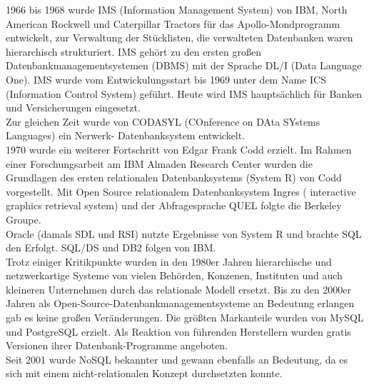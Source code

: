 \documentclass[12pt,a4paper]{report}
\begin{document}
\begin{onehalfspace}
1966 bis 1968 wurde IMS (Information Management System) von IBM, North American Rockwell und Caterpillar Tractors für das Apollo-Mondprogramm entwickelt, zur Verwaltung der Stücklisten, die verwalteten Datenbanken waren hierarchisch strukturiert. IMS gehört zu den ersten großen Datenbankmanagementsystemen (DBMS) mit der Sprache DL/I (Data Language One). IMS wurde vom Entwickulungsstart bis 1969 unter dem Name  ICS (Information Control System) geführt. Heute wird IMS hauptsächlich für Banken und Versicherungen eingesetzt.\\

Zur gleichen Zeit wurde von CODASYL (COnference on DAta SYstems Languages) ein Nerwerk- Datenbanksystem entwickelt.\\

1970 wurde ein weiterer Fortschritt von Edgar Frank Codd erzielt. Im Rahmen einer Forschungsarbeit am IBM Almaden Research Center wurden die Grundlagen des ersten relationalen Datenbanksystems (System R) von Codd vorgestellt. Mit Open Source relationalem Datenbanksystem Ingres ( interactive graphics retrieval system) und der Abfragesprache QUEL folgte die Berkeley Groupe.\\

Oracle (damals SDL und RSI) nutzte Ergebnisse von System R und brachte SQL den Erfolgt. SQL/DS und DB2 folgen von IBM.\\

Trotz einiger Kritikpunkte wurden in den 1980er Jahren hierarchische und netzwerkartige Systeme von vielen Behörden, Konzenen, Instituten und auch kleineren Unternehmen durch das relationale Modell ersetzt. Bis zu den 2000er Jahren als Open-Source-Datenbankmanagementsysteme an Bedeutung erlangen gab es keine großen Veränderungen. Die größten Markanteile wurden von MySQL und PostgreSQL erzielt.
Als Reaktion von führenden Herstellern wurden gratis Versionen ihrer Datenbank-Programme angeboten.\\

Seit 2001 wurde  NoSQL bekannter und gewann ebenfalls an Bedeutung, da es sich mit einem nicht-relationalen Konzept durchsetzten konnte.

\end{onehalfspace}
\end{document}
